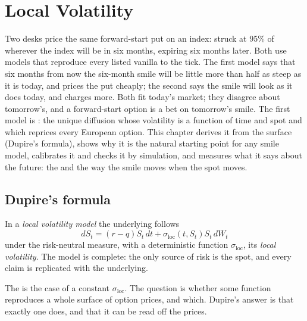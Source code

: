 \chapter{Local Volatility}\label{ch:dv:local-volatility}

Two desks price the same forward-start put on an index: struck at 95\% of
wherever the index will be in six months, expiring six months later. Both use
models that reproduce every listed vanilla to the tick. The first model says
that six months from now the six-month smile will be little more than half as
steep as it is today, and prices the put cheaply; the second says the smile will
look as it does today, and charges more. Both fit today's market; they disagree
about tomorrow's, and a forward-start option is a bet on tomorrow's smile. The
first model is : the unique diffusion whose volatility is a
function of time and spot and which reprices every European option. This chapter
derives it from the surface (Dupire's formula), shows why it is the natural
starting point for any smile model, calibrates it and checks it by simulation, and
measures what it says about the future: the  and the way the smile
moves when the spot moves.

\section{Dupire's formula}

\begin{definition}\label{def:dv:local-volatility:model}
In a \emph{local volatility model} the underlying follows
\[
dS_t=(r-q)S_t\,dt+\sigma_{\mathrm{loc}}(t,S_t)S_t\,dW_t
\]
under the risk-neutral measure, with a deterministic function $\sigma_{\mathrm{loc}}$, its
\emph{local volatility}. The model is complete: the only source of
risk is the spot, and every claim is replicated with the underlying.
\end{definition}

The  is the case of a constant $\sigma_{\mathrm{loc}}$. The question is
whether some function reproduces a whole surface of option prices, and which. Dupire's answer
is that exactly one does, and that it can be read off the prices.

